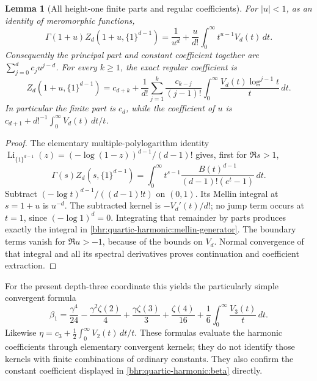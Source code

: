\documentclass[11pt]{article}
\numberwithin{equation}{section}
\theoremstyle{plain}
\newtheorem{lemma}[theorem]{Lemma}
\theoremstyle{definition}
\theoremstyle{remark}
\begin{document}
\begin{lemma}[All height-one finite parts and regular coefficients]
\label{bhr:quartic-harmonic:mellin}
For $|u|<1$, as an identity of meromorphic functions,
\begin{equation}
 \Gamma(1+u)Z_d(1+u,\{1\}^{d-1})
   =\frac1{u^d}+\frac{u}{d!}
       \int_0^\infty t^{u-1}V_d(t)\,dt.
 \label{bhr:quartic-harmonic:mellin-generator}
\end{equation}
Consequently the principal part and constant coefficient together are
$\sum_{j=0}^{d}c_j u^{j-d}$. For every $k\ge1$, the exact regular
coefficient is
\begin{equation}
 [u^k]Z_d(1+u,\{1\}^{d-1})
  =c_{d+k}+\frac1{d!}\sum_{j=1}^k
       \frac{c_{k-j}}{(j-1)!}
       \int_0^\infty\frac{V_d(t)\log^{j-1}t}{t}\,dt.
 \label{bhr:quartic-harmonic:mellin-coefficients}
\end{equation}
In particular the finite part is $c_d$, while the coefficient of $u$
is $c_{d+1}+d!^{-1}\int_0^\infty V_d(t)\,dt/t$.
\end{lemma}

\begin{proof}
The elementary multiple-polylogarithm identity
$\operatorname{Li}_{\{1\}^{d-1}}(z)
=(-\log(1-z))^{d-1}/(d-1)!$ gives, first for $\Re s>1$,
\[
 \Gamma(s)Z_d(s,\{1\}^{d-1})
  =\int_0^\infty t^{s-1}
       \frac{B(t)^{d-1}}{(d-1)!(e^t-1)}\,dt.
\]
Subtract $(-\log t)^{d-1}/((d-1)!t)$ on $(0,1)$.
Its Mellin integral at $s=1+u$ is $u^{-d}$. The subtracted
kernel is $-V_d'(t)/d!$; no jump term occurs at $t=1$, since
$(-\log1)^d=0$. Integrating that remainder by parts produces
exactly the integral in \eqref{bhr:quartic-harmonic:mellin-generator}.
The boundary terms vanish for $\Re u>-1$, because of the bounds on
$V_d$. Normal convergence of that integral and all its spectral
derivatives proves continuation and coefficient extraction.
\end{proof}

For the present depth-three coordinate this yields the particularly
simple convergent formula
\begin{equation}
 \beta_1=
 \frac{\gamma^4}{24}-\frac{\gamma^2\zeta(2)}4
       +\frac{\gamma\zeta(3)}3+\frac{\zeta(4)}{16}
       +\frac16\int_0^\infty\frac{V_3(t)}t\,dt.
 \label{bhr:quartic-harmonic:beta-mellin}
\end{equation}
Likewise $\eta=c_3+\tfrac12\int_0^\infty V_2(t)\,dt/t$.
These formulas evaluate the harmonic coefficients through elementary
convergent kernels; they do not identify those kernels with finite
combinations of ordinary constants. They also confirm the constant
coefficient displayed in \eqref{bhr:quartic-harmonic:beta} directly.
\end{document}
